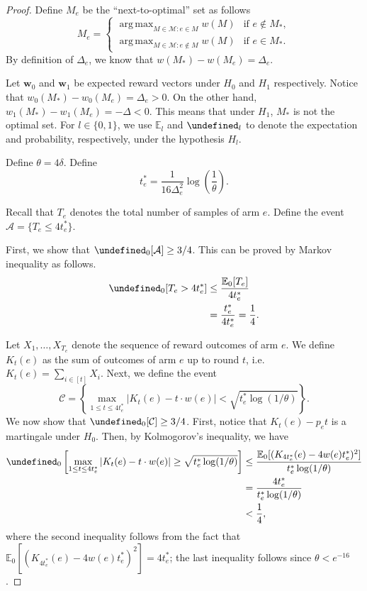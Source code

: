 \documentclass{article}
\newcommand{\E}{\mathbb E}
\newcommand{\M}{\mathcal M}
\DeclareMathOperator*{\argmax}{arg\,max}
\let\Pr\undefined
\DeclareMathOperator{\Pr}{Pr}
\renewcommand{\vec}[1]{\boldsymbol{#1}}
\begin{document}
\begin{spacing}{1.1}
\begin{proof}
Define $M_e$ be the ``next-to-optimal'' set as follows 
$$
M_e = \begin{cases}
		 \argmax_{M\in \M: e \in M} w(M) & \text{if } e\not \in M_*, \\
	     \argmax_{M\in \M: e \not\in M} w(M) & \text{if } e\in M_*.
	  \end{cases}
$$
By definition of $\Delta_e$, we know that $w(M_*)-w(M_e)=\Delta_e$.

Let $\vec w_0$ and $\vec w_1$ be expected reward vectors under $H_0$ and $H_1$ respectively.
Notice that $w_0(M_*)-w_0(M_e)=\Delta_e > 0$.
On the other hand, 
$w_1(M_*)-w_1(M_e) = -\Delta < 0$.
This means that under $H_1$, $M_*$ is not the optimal set.
For $l\in \{0,1\}$, we use $\E_l$ and $\Pr_l$ to denote the expectation and probability, respectively, under the hypothesis $H_l$.

Define $\theta=4\delta$. Define
\begin{equation}
t_e^* = \frac{1}{16\Delta^2_e}\log\left(\frac{1}{\theta}\right).
\label{eq:define-tstar}
\end{equation}

Recall that $T_e$ denotes the total number of samples of arm $e$.
Define the event
$\mathcal A = \{T_e \le 4t_e^* \}$.

First, we show that $\Pr_0[\mathcal A] \ge 3/4$. 
This can be proved by Markov inequality as follows.
\begin{align*}
\Pr_0[T_e > 4t_e^*] &\le \frac{\E_0[T_e]}{4t_e^*} \\
					  &= \frac{t_e^*}{4t_e^*} = \frac14.
\end{align*}

Let $X_1,\ldots,X_{T_e}$ denote the sequence of reward outcomes of arm $e$.
We define $K_t(e)$ as the sum of outcomes of arm $e$ up to round $t$, i.e. $K_t(e) = \sum_{i\in [t]} X_i. $
Next, we define the event 
$$
\mathcal C=\left\{\max_{1\le t \le 4t_e^*} \left|K_t(e)-t\cdot w(e)\right|  < \sqrt{t_e^*\log(1/\theta)} \right\}.
$$
We now show that $\Pr_0[\mathcal C] \ge 3/4$.
First, notice that $K_t(e)-p_e t$ is a martingale under $H_0$.
Then, by Kolmogorov's inequality, we have
\begin{align*}
\Pr_0\left[\max_{1\le t \le 4t_e^*} \left|K_t(e)-t\cdot w(e)\right| \ge \sqrt{t_e^*\log(1/\theta)} \right]
&\le \frac{\E_0[ (K_{4t_e^*}(e)-4w(e)t_e^*)^2]}{t_e^*\log(1/\theta)}\\
&= \frac{4t_e^*}{t_e^*\log(1/\theta)}\\
&< \frac14,
\end{align*}
where the second inequality follows from the fact that $\E_0[(K_{4t_e^*}(e)-4w(e)t_e^*)^2] = 4t_e^*$; the last inequality follows 
since $\theta < e^{-16}$.


\end{proof}
\end{spacing}
\end{document}
